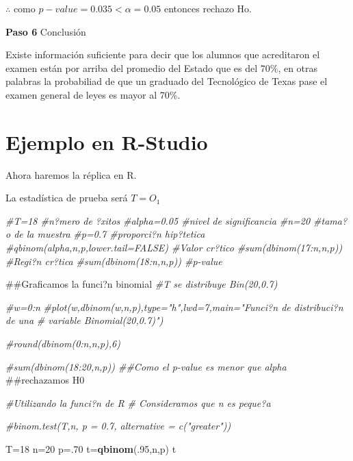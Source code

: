 \documentclass[a4paper,oneside,openany]{book}
\newenvironment{Shaded}{\begin{snugshade}}{\end{snugshade}}
\newcommand{\KeywordTok}[1]{\textcolor[rgb]{0.13,0.29,0.53}{\textbf{#1}}}
\newcommand{\DecValTok}[1]{\textcolor[rgb]{0.00,0.00,0.81}{#1}}
\newcommand{\CommentTok}[1]{\textcolor[rgb]{0.56,0.35,0.01}{\textit{#1}}}
\newcommand{\NormalTok}[1]{#1}
\begin{document}
\(\therefore\) como \(p-value=0.035<\alpha=0.05\) entonces rechazo Ho.

\textbf{Paso 6} Conclusión

Existe información suficiente para decir que los alumnos que acreditaron
el examen están por arriba del promedio del Estado que es del 70\%, en
otras palabras la probabiliad de que un graduado del Tecnológico de
Texas pase el examen general de leyes es mayor al 70\%.

\section{Ejemplo en R-Studio}\label{ejemplo-en-r-studio}

Ahora haremos la réplica en R.

La estadística de prueba será \(T=O_1\)

\begin{Shaded}
\begin{Highlighting}[]
\CommentTok{#T=18                                   #n?mero de ?xitos}
\CommentTok{#alpha=0.05                             #nivel de significancia}
\CommentTok{#n=20                                   #tama?o de la muestra}
\CommentTok{#p=0.7                                  #proporci?n  hip?tetica}
\CommentTok{#qbinom(alpha,n,p,lower.tail=FALSE)     #Valor cr?tico}
\CommentTok{#sum(dbinom(17:n,n,p))                  #Regi?n cr?tica}
\CommentTok{#sum(dbinom(18:n,n,p))                  #p-value}



\NormalTok{##Graficamos la funci?n binomial}
\CommentTok{#T se distribuye Bin(20,0.7)}

\CommentTok{#w=0:n}
\CommentTok{#plot(w,dbinom(w,n,p),type="h",lwd=7,main="Funci?n de distribuci?n de una }
 \CommentTok{#   variable Binomial(20,0.7)")}


\CommentTok{#round(dbinom(0:n,n,p),6)}

\CommentTok{#sum(dbinom(18:20,n,p))              ##Como el p-value es menor que alpha}
\NormalTok{                                    ##rechazamos H0}

\CommentTok{#Utilizando la funci?n de R}
\CommentTok{# Consideramos que n es peque?a}

\CommentTok{#binom.test(T,n, p = 0.7, alternative = c("greater"))}


\NormalTok{T=}\DecValTok{18}
\NormalTok{n=}\DecValTok{20}
\NormalTok{p=.}\DecValTok{70}
\NormalTok{t=}\KeywordTok{qbinom}\NormalTok{(.}\DecValTok{95}\NormalTok{,n,p)}
\NormalTok{t}
\end{Highlighting}
\end{Shaded}
\end{document}
